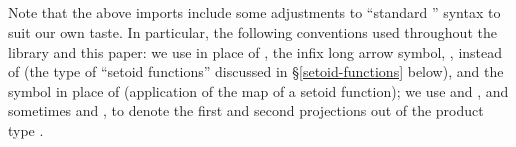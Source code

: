 \begin{code}%
\>[0]\<%
\\
\>[0]%
\>[13]%
\>[52]\AgdaSpace{}%
\<%
\\
\>[0]%
\>[13]%
\>[52]\AgdaSpace{}%
\<%
\\
\>[0]%
\>[13]%
\>[52]\AgdaSpace{}%
\<%
\\
%
\\[\AgdaEmptyExtraSkip]%
\>[0]\AgdaSpace{}%
\<%
\\
\>[0][@{}l@{\AgdaIndent{0}}]%
\>[1]\AgdaSpace{}%
\AgdaSpace{}%
\AgdaSpace{}%
\AgdaSpace{}%
\AgdaSpace{}%
\AgdaSpace{}%
\AgdaSpace{}%
\AgdaSpace{}%
\AgdaSpace{}%
\AgdaSpace{}%
\AgdaSpace{}%
\AgdaSymbol{:}\AgdaSpace{}%
\<%
\\
%
\>[1]\AgdaSpace{}%
\AgdaSpace{}%
\AgdaSymbol{:}\AgdaSpace{}%
\AgdaSpace{}%
\<%
\\
%
\>[1]\AgdaSpace{}%
\AgdaSymbol{:}\AgdaSpace{}%
\AgdaSpace{}%
\<%
\\
\>[0]\<%
\end{code}
\fi
Note that the above imports include some adjustments to ``standard \agda'' syntax to suit our own taste.
In particular, the following conventions used throughout the \agdaalgebras library and this paper:
we use  in place of , the infix long arrow symbol,
, instead of  (the type of ``setoid functions'' discussed in §\ref{setoid-functions} below), and the symbol  in place of  (application of the map of a setoid function); we use
 and , and sometimes  and
, to denote the first and second
projections out of the product type
.
\ifshort\else

